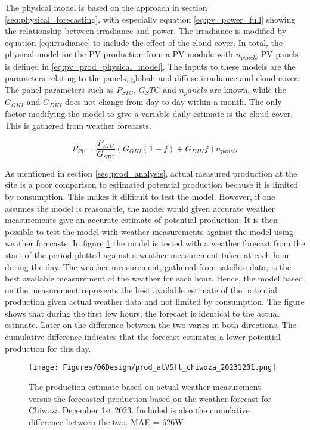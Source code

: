 The physical model is based on the approach in section \ref{seq:physical_forecasting}, with especially equation \ref{eq:pv_power_full} showing the relationship between irradiance and power. The irradiance is modified by equation \ref{eq:irradiance} to include the effect of the cloud cover. In total, the physical model for the PV-production from a PV-module with $n_{panels}$ PV-panels is defined in \ref{eq:pv_prod_physical_model}. The inputs to these models are the parameters relating to the panels, global- and diffuse irradiance and cloud cover. The panel parameters such as $P_{STC}$, $G_STC$ and $n_panels$ are known, while the $G_{GHI}$ and $G_{DHI}$ does not change from day to day within a month. The only factor modifying the model to give a variable daily estimate is the cloud cover. This is gathered from weather forecasts. 

\begin{equation}
    P_{PV} = \frac{P_{STC}}{G_{STC}}(G_{GHI}(1-f)+G_{DHI}f)n_{panels}
    \label{eq:pv_prod_physical_model}
\end{equation}

As mentioned in section \ref{seq:prod_analysis}, actual measured production at the site is a poor comparison to estimated potential production because it is limited by consumption. This makes it difficult to test the model. However, if one assumes the model is reasonable, the model would given accurate weather measurements give an accurate estimate of potential production. It is then possible to test the model with weather measurements against the model using weather forecasts. In figure \ref{fig:prod_atVSft_chiwoza_20231201} the model is tested with a weather forecast from the start of the period plotted against a weather measurement taken at each hour during the day. The weather measurement, gathered from satellite data\cite{met.no}, is the best available measurement of the weather for each hour. Hence, the model based on the measurement represents the best available estimate of the potential production given actual weather data and not limited by consumption. The figure shows that during the first few hours, the forecast is identical to the actual estimate. Later on the difference between the two varies in both directions. The cumulative difference indicates that the forecast estimates a lower potential production for this day. 

\begin{figure}
    \centering
    \texttt{[image: Figures/06Design/prod\_atVSft\_chiwoza\_20231201.png]}
    \caption[Forecasted vs estimated potential production]{The production estimate based on actual weather measurement versus the forecasted production based on the weather forecast for Chiwoza December 1st 2023. Included is also the cumulative difference between the two. MAE = 626W}
    \label{fig:prod_atVSft_chiwoza_20231201}
\end{figure}

